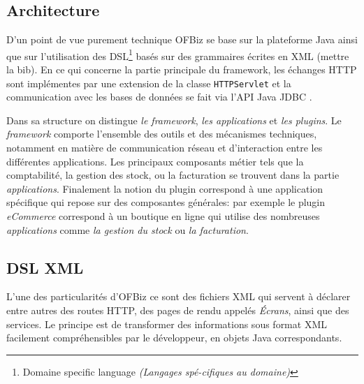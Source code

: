 \subsection{Architecture }
D'un point de vue purement technique OFBiz se base sur la plateforme Java ainsi que sur l'utilisation des DSL\footnote{Domaine specific language \emph{(Langages spé-cifiques au domaine)}} basés sur des grammaires écrites en XML (mettre la bib). En ce qui concerne la partie principale du framework, les échanges HTTP sont implémentes par une extension de la classe \verb=HTTPServlet= \cite{chan2017servlet} et la communication avec les bases de données se fait via l'API Java JDBC \cite{JDBC}.

Dans sa structure on distingue \emph{le framework}, \emph{les applications} et \emph{les plugins}. Le \emph{framework} comporte l'ensemble des outils et des mécanismes techniques, notamment en matière de  communication réseau et d'interaction entre les différentes applications.
Les principaux composants métier tels que la comptabilité, la gestion des stock, ou la facturation se trouvent dans la partie \emph{applications}. 
Finalement la notion du plugin correspond à une application spécifique qui repose sur des composantes générales: par exemple le plugin \emph{eCommerce} correspond à un boutique en ligne qui utilise des nombreuses  \emph{applications} comme \emph{la gestion du stock} ou \emph{la facturation}. 

\subsection{DSL XML}
L'une des particularités d'OFBiz ce sont des fichiers XML qui servent à déclarer entre autres
des routes HTTP, des pages de rendu appelés \emph{Écrans}, ainsi que des services. Le principe est de transformer des informations sous format XML facilement compréhensibles par le développeur, en objets Java correspondants. 


